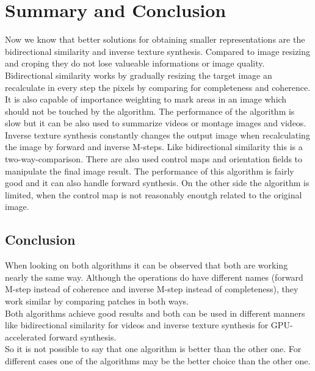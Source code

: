 \section{Summary and Conclusion}
Now we know that better solutions for obtaining smaller representations are the bidirectional similarity and inverse texture synthesis. Compared to image resizing and croping they do not lose valueable informations or image quality.\\
Bidirectional similarity works by gradually resizing the target image an recalculate in every step the pixels by comparing for completeness and coherence. It is also capable of importance weighting to mark areas in an image which should not be touched by the algorithm. The performance of the algorithm is slow but it can be also used to summarize videos or montage images and videos.\\
Inverse texture synthesis constantly changes the output image when recalculating the image by forward and inverse M-steps. Like bidirectional similarity this is a two-way-comparison. There are also used control maps and orientation fields to manipulate the final image result. The performance of this algorithm is fairly good and it can also handle forward synthesis. On the other side the algorithm is limited, when the control map is not reasonably enoutgh  related to the original image.

\subsection*{Conclusion}
When looking on both algorithms it can be observed that both are working nearly the same way. Although the operations do have different names (forward M-step instead of coherence and inverse M-step instead of completeness), they work similar by comparing patches in both ways.\\
Both algorithms achieve good results and both can be used in different manners like bidirectional similarity for videos and inverse texture synthesis for GPU-accelerated forward synthesis.\\
So it is not possible to say that one algorithm is better than the other one. For different cases one of the algorithms may be the better choice than the other one.